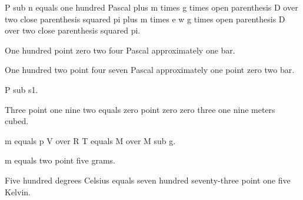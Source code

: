 P sub n equals one hundred Pascal plus m times g times open parenthesis D over two close parenthesis squared pi plus m times e w g times open parenthesis D over two close parenthesis squared pi.

One hundred point zero two four Pascal approximately one bar.

One hundred two point four seven Pascal approximately one point zero two bar.

P sub s1.

Three point one nine two equals zero point zero zero three one nine meters cubed.

m equals p V over R T equals M over M sub g.

m equals two point five grams.

Five hundred degrees Celsius equals seven hundred seventy-three point one five Kelvin.